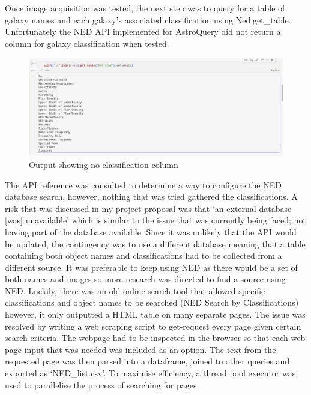 \documentclass[12pt,runningheads]{llncs}
\begin{document}
Once image acquisition was tested, the next step was to query for a table of galaxy
names and each galaxy's associated classification using Ned.get\_table. Unfortunately
the NED API implemented for AstroQuery did not return a column for galaxy classification 
when tested. 

\begin{figure}[h]
    \includegraphics[scale=0.3]{Screenshot_2024-01-31_23-37-59.png}
    \centering
    \caption{Output showing no classification column}\label{tab1}
\end{figure}

The API reference was consulted to determine a way to configure the NED database search,
however, nothing that was tried gathered the classifications. A risk that was discussed
in my project proposal was that ‘an external database [was] unavailable’ which is similar
to the issue that was currently being faced; not having part of the database available.
Since it was unlikely that the API would be updated, the contingency was to use a different
database meaning that a table containing both object names and classifications had to be
collected from a different source. It was preferable to keep using NED as there would
be a set of both names and images so more research was directed to find a source using
NED. Luckily, there was an old online search tool that allowed specific classifications
and object names to be searched (NED Search by Classifications) however, it only outputted
a HTML table on many separate pages. The issue was resolved by writing a web scraping
script to get-request every page given certain search criteria. The webpage had to be
inspected in the browser so that each web page input that was needed was included as an 
option. The text from the requested page was then parsed into a dataframe, joined to other
queries and exported as ‘NED\_list.csv’. To maximise efficiency, a thread pool executor was
used to parallelise the process of searching for pages.
\end{document}
